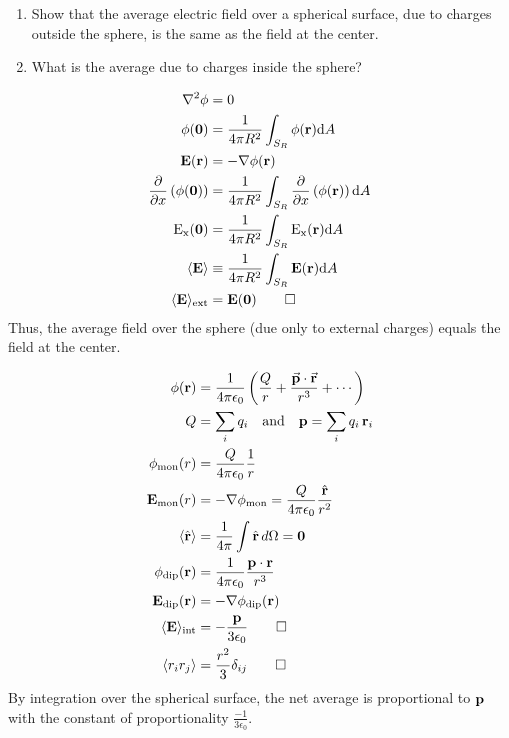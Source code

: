 \begin{hwkProblem}{3.4}{}

	\begin{enumerate}
		\item Show that the average electric field over a spherical surface, due to charges outside the sphere, is the same as the field at the center.
		\item What is the average due to charges inside the sphere?
	\end{enumerate}

	\hwkSol{}

	\hwkPart{}

	\begin{align*}
		\nabla^2 \phi &= 0 \\
		\func{\phi}[\vecb{0}] &= \frac{1}{4\pi R^2} \int_{S_R} \func{\phi}[\vecb{r}] \mathrm{d}A \\
		\func{\vecb{E}}[\vecb{r}] &= -\nabla \func{\phi}[\vecb{r}] \\
		\pderiv{x}{\func{\phi}[\vecb{0}]} &=\frac{1}{4\pi R^2}\int_{S_R} \pderiv{x}{\func{\phi}[\vecb{r}]} \mathrm{d}A \\
		\func{E_{x}}[\vecb{0}] &= \frac{1}{4\pi R^2}\int_{S_R} \func{E_{x}}[\vecb{r}] \mathrm{d}A \\
		\langle \vecb{E} \rangle &\equiv \frac{1}{4\pi R^2} \int_{S_R} \func{\vecb{E}}[\vecb{r}] \mathrm{d}A \\
		\langle \vecb{E} \rangle_{\mathrm{ext}} &= \func{\vecb{E}}[\vecb{0}] \qed
	\end{align*}
	Thus, the average field over the sphere (due only to external charges) equals the field at the center.

	\hwkPart{}

	\begin{align*}
	\func{\phi}[\vecb{r}] &= \frac{1}{4\pi \epsilon_0} \left( \frac{Q}{r} + \frac{\vec{p}\cdot\vec{r}}{r^3} + \cdots \right) \\
	Q &= \sum_i q_i \quad \text{and} \quad \vecb{p} = \sum_i q_i\,\vecb{r}_i \\
	\func{\phi_{\text{mon}}}[r] &= \frac{Q}{4\pi\epsilon_0}\frac{1}{r} \\
	\func{\vecb{E}_{\text{mon}}}[r] &= -\nabla \phi_{\text{mon}} = \frac{Q}{4\pi\epsilon_0}\frac{\hat{r}}{r^2} \\
	\langle \hat{r} \rangle &= \frac{1}{4\pi}\int \hat{r}\,d\Omega = \vecb{0} \\
	\func{\phi_{\text{dip}}}[\vecb{r}] &= \frac{1}{4\pi\epsilon_0}\frac{\vecb{p}\cdot\vecb{r}}{r^3} \\
	\func{\vecb{E}_{\text{dip}}}[\vecb{r}] &= -\nabla{\func{\phi_{\text{dip}}}[\vecb{r}]} \\
	\langle \vecb{E} \rangle_{\mathrm{int}} &= -\frac{\vecb{p}}{3\epsilon_0} \qed \\
	\langle r_i r_j \rangle &= \frac{r^2}{3}\delta_{ij} \qed
	\end{align*}
	By integration over the spherical surface, the net average is proportional to \(\mathbf{p}\) with the constant of proportionality \(\frac{-1}{3\epsilon_0}\).

\end{hwkProblem}
